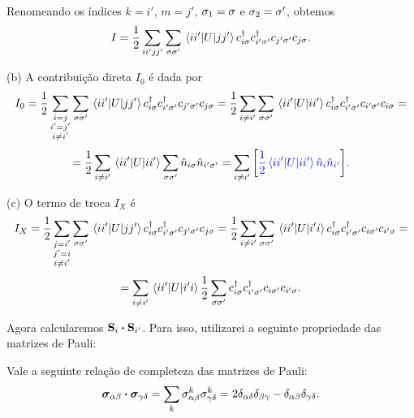 \documentclass[a4paper,10pt]{article}
\begin{document}
Renomeando os índices $k = i'$, $m = j'$, $\sigma_1 = \sigma$ e $\sigma_2 = \sigma'$, obtemos
$$
I =
\frac{1}{2} \sum_{ii'jj'} \sum_{\sigma\sigma'}
\mel{ii'}{U}{jj'} c_{i\sigma}^\dagger c_{i'\sigma'}^\dagger c_{j'\sigma'} c_{j\sigma}.
$$

\n

(b) A contribuição direta $I_0$ é dada por
$$
I_0 =
\frac{1}{2} \sum_{\substack{i = j \\ i' = j' \\ i \neq i'}}
\sum_{\sigma\sigma'} \mel{ii'}{U}{jj'} c_{i\sigma}^\dagger c_{i'\sigma'}^\dagger c_{j'\sigma'} c_{j\sigma} =
\frac{1}{2} \sum_{i \neq i'} \sum_{\sigma\sigma'}
\mel{ii'}{U}{ii'} c_{i\sigma}^\dagger c_{i'\sigma'}^\dagger c_{i'\sigma'} c_{i\sigma} =
$$
$$
= \frac{1}{2} \sum_{i \neq i'}
\mel{ii'}{U}{ii'} \sum_{\sigma\sigma'} \hat{n}_{i\sigma} \hat{n}_{i'\sigma'} =
\sum_{i \neq i'}
\qty[ \textcolor{blue}{ \frac{1}{2} \mel{ii'}{U}{ii'} \hat{n}_{i} \hat{n}_{i'} } ].
$$

(c) O termo de troca $I_{X}$ é
$$
I_{X} =
\frac{1}{2} \sum_{\substack{j = i' \\ j' = i \\ i \neq i'}}
\sum_{\sigma\sigma'} \mel{ii'}{U}{jj'} c_{i\sigma}^\dagger c_{i'\sigma'}^\dagger c_{j'\sigma'} c_{j\sigma} =
\frac{1}{2} \sum_{i \neq i'} \sum_{\sigma\sigma'}
\mel{ii'}{U}{i'i} c_{i\sigma}^\dagger c_{i'\sigma'}^\dagger c_{i\sigma'} c_{i'\sigma} =
$$
$$
= \sum_{i \neq i'}
\mel{ii'}{U}{i'i} \frac{1}{2} \sum_{\sigma\sigma'} c_{i\sigma}^\dagger c_{i'\sigma'}^\dagger c_{i\sigma'} c_{i'\sigma}.
$$

Agora calcularemos $\vb{S}_i \vdot \vb{S}_{i'}$. Para isso, utilizarei a seguinte propriedade das matrizes de Pauli:
\begin{lema}{1}
Vale a seguinte relação de completeza das matrizes de Pauli:
$$
\bm{\s}_{\alpha \beta} \vdot \bm{\s}_{\gamma \delta} =
\sum_{k} \s_{\alpha \beta}^k \s_{\gamma \delta}^k =
2 \delta_{\alpha \delta} \delta_{\beta \gamma} - \delta_{\alpha \beta} \delta_{\gamma \delta}.
$$
\end{lema}
\end{document}
